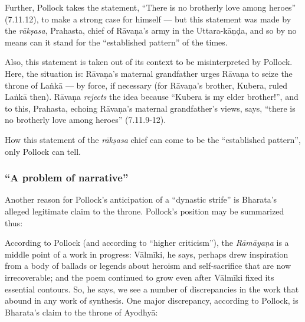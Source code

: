 Further, Pollock takes the statement, “There is no brotherly love among heroes” (7.11.12), to make a strong case for himself --- but this statement was made by the {\sl rākṣasa}, Prahasta, chief of Rāvaṇa’s army in the Uttara-kāṇḍa, and so by no means can it stand for the “established pattern” of the times. 

Also, this statement is taken out of its context to be misinterpreted by Pollock. Here, the situation is: Rāvaṇa’s maternal grandfather urges Rāvaṇa to seize the throne of Laṅkā --- by force, if necessary (for Rāvaṇa’s brother, Kubera, ruled Laṅkā then). Rāvaṇa {\sl rejects} the idea because “Kubera is my elder brother!”, and to this, Prahasta, echoing Rāvaṇa’s maternal grandfather’s views, says, “there is no brotherly love among heroes” (7.11.9-12).

How this statement of the {\sl rākṣasa} chief can come to be the “established pattern”, only Pollock can tell. 

\subsubsection{“A problem of narrative”}\label{sec1.2.3.2}

Another reason for Pollock’s anticipation of a “dynastic strife” is Bharata’s alleged legitimate claim to the throne. Pollock’s position may be summarized thus: 

According to Pollock (and according to “higher criticism”), the {\sl Rāmāyaṇa} is a middle point of a work in progress: Vālmīki, he says, perhaps drew inspiration from a body of ballads or legends about heroism and self-sacrifice that are now irrecoverable; and the poem continued to grow even after Vālmīki fixed its essential contours. So, he says, we see a number of discrepancies in the work that abound in any work of synthesis. One major discrepancy, according to Pollock, is Bharata’s claim to the throne of Ayodhyā: 

